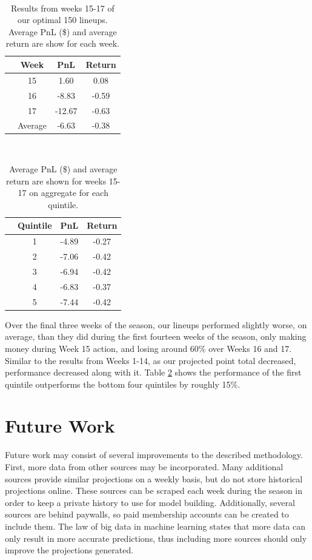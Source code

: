\documentclass[12pt]{article}
\begin{document}
﻿\begin{table}[H]
\caption{Results from weeks 15-17 of our optimal 150 lineups. Average PnL (\$) and average return are show for each week.}
\centering
\begin{tabular}{lccc}
\toprule
{} &  Week &    PnL &  Return \\
\midrule
{} &    15 &   1.60 &    0.08 \\
{} &    16 &  -8.83 &   -0.59 \\
{} &    17 & -12.67 &   -0.63 \\
{} &    Average & -6.63 &  -0.38 \\
\bottomrule
\end{tabular}
\label{testing weeks results}
\end{table}

﻿\begin{table}[H]
\caption{Average PnL (\$) and average return are shown for weeks 15-17 on aggregate for each quintile.}
\centering
\begin{tabular}{lccc}
\toprule
{} &  Quintile &   PnL &   Return \\
\midrule
{} &         1 & -4.89 & -0.27 \\
{} &         2 & -7.06 & -0.42 \\
{} &         3 & -6.94 & -0.42 \\
{} &         4 & -6.83 & -0.37 \\
{} &         5 & -7.44 & -0.42 \\
\bottomrule
\end{tabular}
\label{testing quintile results}
\end{table}

Over the final three weeks of the season, our lineups performed slightly worse, on average, than they did during the first fourteen weeks of the season, only making money during Week 15 action, and losing around 60\% over Weeks 16 and 17. Similar to the results from Weeks 1-14, as our projected point total decreased, performance decreased along with it. Table \ref{testing quintile results} shows the performance of the first quintile outperforms the bottom four quintiles by roughly 15\%. 


\pagebreak
\section{Future Work}
Future work may consist of several improvements to the described methodology. First, more data from other sources may be incorporated. Many additional sources provide similar projections on a weekly basis, but do not store historical projections online. These sources can be scraped each week during the season in order to keep a private history to use for model building. Additionally, several sources are behind paywalls, so paid membership accounts can be created to include them. The law of big data in machine learning states that more data can only result in more accurate predictions, thus including more sources should only improve the projections generated.\bigskip
\end{document}
